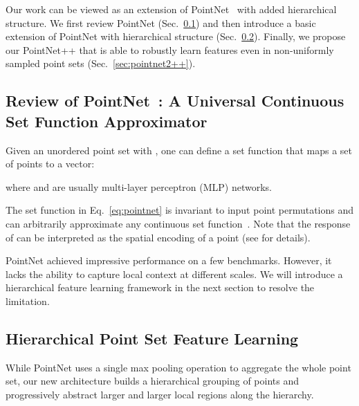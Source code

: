 \documentclass{article}
\begin{document}
Our work can be viewed as an extension of PointNet~\cite{qi2016pointnet} with added hierarchical structure. We first review PointNet (Sec.~\ref{sec:pointnet}) and then introduce a basic extension of PointNet with hierarchical structure (Sec.~\ref{sec:pointnet2}). Finally, we propose our PointNet++ that is able to robustly learn features even in non-uniformly sampled point sets (Sec.~\ref{sec:pointnet2++}).

\vspace{-0.3cm}
\subsection{Review of PointNet~\cite{qi2016pointnet}: A Universal Continuous Set Function Approximator}
\label{sec:pointnet}

Given an unordered point set  with , one can define a set function  that maps a set of points to a vector:
\vspace{-0.3cm}

where  and  are usually multi-layer perceptron (MLP) networks.

The set function  in Eq.~\ref{eq:pointnet} is invariant to input point permutations and can arbitrarily approximate any continuous set function~\cite{qi2016pointnet}. Note that the response of  can be interpreted as the spatial encoding of a point (see \cite{qi2016pointnet} for details). 







PointNet achieved impressive performance on a few benchmarks. However, it lacks the ability to capture local context at different scales. We will introduce a hierarchical feature learning framework in the next section to resolve the limitation.    








\vspace{-0.3cm}
\subsection{Hierarchical Point Set Feature Learning}
\label{sec:pointnet2}


While PointNet uses a single max pooling operation to aggregate the whole point set, our new architecture builds a hierarchical grouping of points and progressively abstract larger and larger local regions along the hierarchy. 
\end{document}
